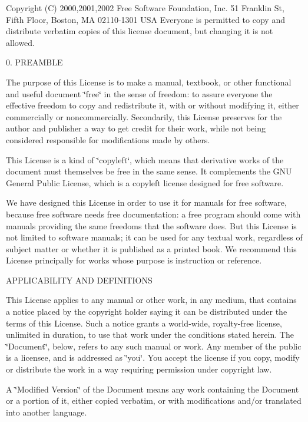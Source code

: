 Copyright (C) 2000,2001,2002 Free Software Foundation, Inc. 51 Franklin St, Fifth Floor, Boston, MA 02110-\/1301 U\+SA Everyone is permitted to copy and distribute verbatim copies of this license document, but changing it is not allowed.

0. P\+R\+E\+A\+M\+B\+LE

The purpose of this License is to make a manual, textbook, or other functional and useful document \char`\"{}free\char`\"{} in the sense of freedom\+: to assure everyone the effective freedom to copy and redistribute it, with or without modifying it, either commercially or noncommercially. Secondarily, this License preserves for the author and publisher a way to get credit for their work, while not being considered responsible for modifications made by others.

This License is a kind of \char`\"{}copyleft\char`\"{}, which means that derivative works of the document must themselves be free in the same sense. It complements the G\+NU General Public License, which is a copyleft license designed for free software.

We have designed this License in order to use it for manuals for free software, because free software needs free documentation\+: a free program should come with manuals providing the same freedoms that the software does. But this License is not limited to software manuals; it can be used for any textual work, regardless of subject matter or whether it is published as a printed book. We recommend this License principally for works whose purpose is instruction or reference.


\begin{DoxyEnumerate}
\item A\+P\+P\+L\+I\+C\+A\+B\+I\+L\+I\+TY A\+ND D\+E\+F\+I\+N\+I\+T\+I\+O\+NS
\end{DoxyEnumerate}

This License applies to any manual or other work, in any medium, that contains a notice placed by the copyright holder saying it can be distributed under the terms of this License. Such a notice grants a world-\/wide, royalty-\/free license, unlimited in duration, to use that work under the conditions stated herein. The \char`\"{}\+Document\char`\"{}, below, refers to any such manual or work. Any member of the public is a licensee, and is addressed as \char`\"{}you\char`\"{}. You accept the license if you copy, modify or distribute the work in a way requiring permission under copyright law.

A \char`\"{}\+Modified Version\char`\"{} of the Document means any work containing the Document or a portion of it, either copied verbatim, or with modifications and/or translated into another language.


